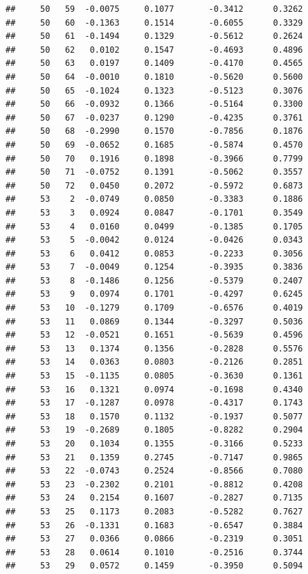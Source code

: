 \documentclass[
]{article}
\begin{document}
\begin{verbatim}
##     50   59  -0.0075     0.1077       -0.3412      0.3262  
##     50   60  -0.1363     0.1514       -0.6055      0.3329  
##     50   61  -0.1494     0.1329       -0.5612      0.2624  
##     50   62   0.0102     0.1547       -0.4693      0.4896  
##     50   63   0.0197     0.1409       -0.4170      0.4565  
##     50   64  -0.0010     0.1810       -0.5620      0.5600  
##     50   65  -0.1024     0.1323       -0.5123      0.3076  
##     50   66  -0.0932     0.1366       -0.5164      0.3300  
##     50   67  -0.0237     0.1290       -0.4235      0.3761  
##     50   68  -0.2990     0.1570       -0.7856      0.1876  
##     50   69  -0.0652     0.1685       -0.5874      0.4570  
##     50   70   0.1916     0.1898       -0.3966      0.7799  
##     50   71  -0.0752     0.1391       -0.5062      0.3557  
##     50   72   0.0450     0.2072       -0.5972      0.6873  
##     53    2  -0.0749     0.0850       -0.3383      0.1886  
##     53    3   0.0924     0.0847       -0.1701      0.3549  
##     53    4   0.0160     0.0499       -0.1385      0.1705  
##     53    5  -0.0042     0.0124       -0.0426      0.0343  
##     53    6   0.0412     0.0853       -0.2233      0.3056  
##     53    7  -0.0049     0.1254       -0.3935      0.3836  
##     53    8  -0.1486     0.1256       -0.5379      0.2407  
##     53    9   0.0974     0.1701       -0.4297      0.6245  
##     53   10  -0.1279     0.1709       -0.6576      0.4019  
##     53   11   0.0869     0.1344       -0.3297      0.5036  
##     53   12  -0.0521     0.1651       -0.5639      0.4596  
##     53   13   0.1374     0.1356       -0.2828      0.5576  
##     53   14   0.0363     0.0803       -0.2126      0.2851  
##     53   15  -0.1135     0.0805       -0.3630      0.1361  
##     53   16   0.1321     0.0974       -0.1698      0.4340  
##     53   17  -0.1287     0.0978       -0.4317      0.1743  
##     53   18   0.1570     0.1132       -0.1937      0.5077  
##     53   19  -0.2689     0.1805       -0.8282      0.2904  
##     53   20   0.1034     0.1355       -0.3166      0.5233  
##     53   21   0.1359     0.2745       -0.7147      0.9865  
##     53   22  -0.0743     0.2524       -0.8566      0.7080  
##     53   23  -0.2302     0.2101       -0.8812      0.4208  
##     53   24   0.2154     0.1607       -0.2827      0.7135  
##     53   25   0.1173     0.2083       -0.5282      0.7627  
##     53   26  -0.1331     0.1683       -0.6547      0.3884  
##     53   27   0.0366     0.0866       -0.2319      0.3051  
##     53   28   0.0614     0.1010       -0.2516      0.3744  
##     53   29   0.0572     0.1459       -0.3950      0.5094  

\end{verbatim}
\end{document}
